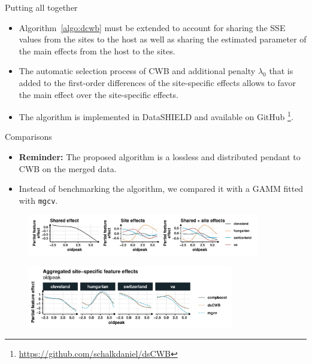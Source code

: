 \documentclass[t,10pt]{beamer}
\begin{document}
\begin{frame}{Putting all together}
  \begin{itemize}
    \item
      Algorithm~\ref{algo:dcwb} must be extended to account for sharing the SSE values from the sites to the host as well as sharing the estimated parameter of the main effects from the host to the sites.
    \item
      The automatic selection process of CWB and additional penalty $\lambda_0$ that is added to the first-order differences of the site-specific effects allows to favor the main effect over the site-specific effects.
    \item
      The algorithm is implemented in DataSHIELD and available on GitHub \footnote[frame,1]{\url{https://github.com/schalkdaniel/dsCWB}}.
  \end{itemize}
\end{frame}


\begin{frame}{Comparisons}
  \begin{itemize}
    \item \textbf{Reminder:} The proposed algorithm is a lossless and distributed pendant to CWB on the merged data.
    \item Instead of benchmarking the algorithm, we compared it with a GAMM fitted with \texttt{mgcv}.
  \end{itemize}
  \begin{figure}
    \centering
    \includegraphics[width=0.9\textwidth]{figures/fig-dcwb-effect-decomposition.pdf}
  \end{figure}
  \vspace{-0.2cm}
  \begin{figure}
    \centering
    \includegraphics[width=0.8\textwidth]{figures/fig-dcwb-effect-comparison.pdf}
  \end{figure}
\end{frame}
\end{document}
